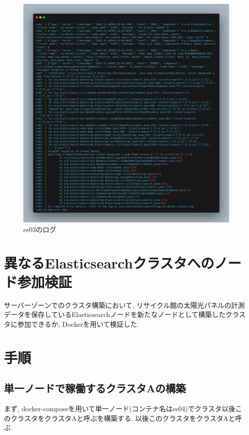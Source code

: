 \begin{figure}[!ht]
  \begin{center}
    \includegraphics[width=160mm]{sotu/figure/log.png}
    \caption{es03のログ}
    \label{p3}
  \end{center}
\end{figure}

\section{異なるElasticsearchクラスタへのノード参加検証}
サーバーゾーンでのクラスタ構築において, リサイクル館の太陽光パネルの計測データを保存しているElasticsearchノードを新たなノードとして構築したクラスタに参加できるか, Dockerを用いて検証した.

\section{手順}

\subsection{単一ノードで稼働するクラスタAの構築}

まず, docker-composeを用いて単一ノード(コンテナ名はes04)でクラスタ以後このクラスタをクラスタAと呼ぶを構築する. 以後このクラスタをクラスタAと呼ぶ.

